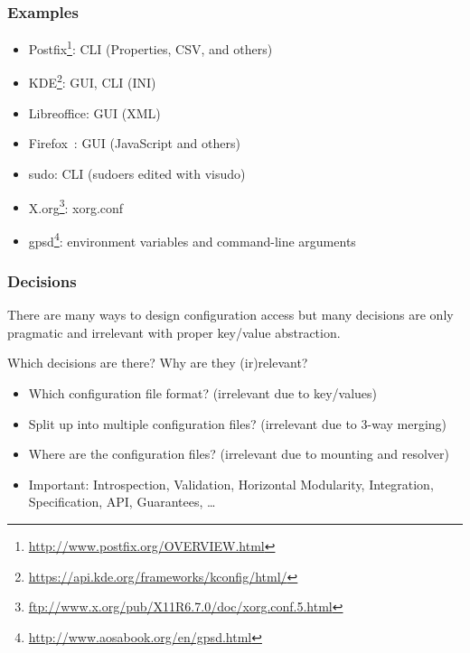 \begin{frame}
	\frametitle{Examples}

	\begin{itemize}
	\item Postfix\footnote{\url{http://www.postfix.org/OVERVIEW.html}}: CLI (Properties, CSV, and others)
	\item KDE\footnote{\url{https://api.kde.org/frameworks/kconfig/html/}}: GUI, CLI (INI)
	\item Libreoffice: GUI (XML)
	\item Firefox~\cite{jin2014configurations}: GUI (JavaScript and others)
	\item sudo: CLI (sudoers edited with visudo)
	\item X.org\footnote{\url{ftp://www.x.org/pub/X11R6.7.0/doc/xorg.conf.5.html}}: xorg.conf
	\item gpsd\footnote{\url{http://www.aosabook.org/en/gpsd.html}}: environment variables and command-line arguments
	\end{itemize}
\end{frame}

\begin{frame}
	\frametitle{Decisions}

	There are many ways to design configuration access but many decisions are only pragmatic and irrelevant with proper key/value abstraction.

	\begin{task}
	Which decisions are there?
	Why are they (ir)relevant?
	\end{task}

	\pause

	\begin{itemize}
	\item Which configuration file format? (irrelevant due to key/values)
	\item Split up into multiple configuration files? (irrelevant due to 3-way merging)
	\item Where are the configuration files? (irrelevant due to mounting and resolver)
	\item Important: Introspection, Validation, Horizontal Modularity, Integration,
		Specification, API, Guarantees, \dots
	\end{itemize}
\end{frame}

